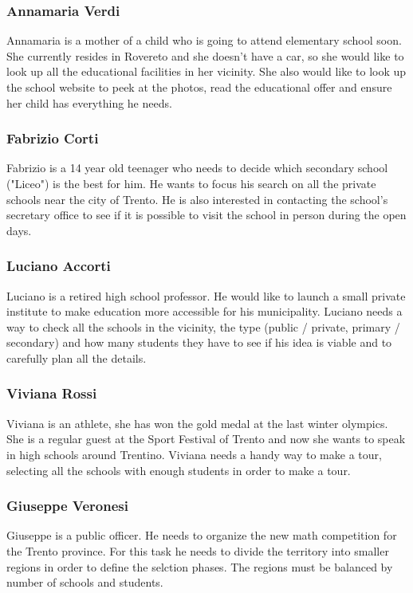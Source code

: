 \subsubsection{Annamaria Verdi}
Annamaria is a mother of a child who is going to attend elementary school soon. She currently resides in Rovereto and she doesn't have a car, so she would like to look up all the educational facilities in her vicinity. 
She also would like to look up the school website to peek at the photos, read the educational offer and ensure her child has everything he needs.

\subsubsection{Fabrizio Corti}
Fabrizio is a 14 year old teenager who needs to decide which secondary school ("Liceo") is the best for him. He wants to focus his search on all the private schools near the city of Trento. 
He is also interested in contacting the school's secretary office to see if it is possible to visit the school in person during the open days.

\subsubsection{Luciano Accorti}
Luciano is a retired high school professor. He would like to launch a small private institute to make education more accessible for his municipality.
Luciano needs a way to check all the schools in the vicinity, the type (public / private, primary / secondary) and how many students they have to see if his idea is viable and to carefully plan all the details.


\subsubsection{Viviana Rossi}
Viviana is an athlete, she has won the gold medal at the last winter olympics. She is a regular guest at the Sport Festival of Trento and now she wants to speak in high schools around Trentino.
Viviana needs a handy way to make a tour, selecting all the schools with enough students in order to make a tour.

\subsubsection{Giuseppe Veronesi}
Giuseppe is a public officer. He needs to organize the new math competition for the Trento province. For this task he needs to divide the territory into smaller regions in order to define the selction phases.
The regions must be balanced by number of schools and students.

